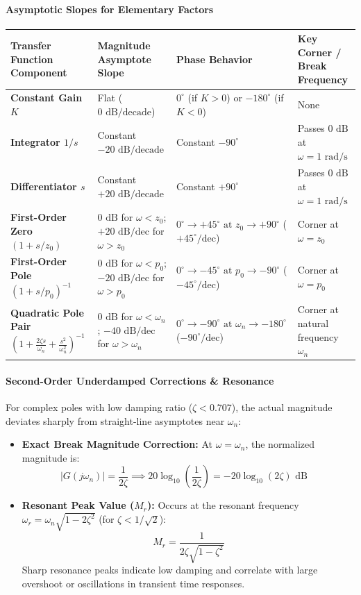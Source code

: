 \documentclass[12pt,onecolumn,twoside ]{article}
\begin{document}
	\paragraph{Asymptotic Slopes for Elementary Factors}
	\begin{center}\small\begin{tabularx}{\textwidth}{*{4}{Y}}
			\toprule
			\textbf{Transfer Function Component} & \textbf{Magnitude Asymptote Slope} & \textbf{Phase Behavior} & \textbf{Key Corner / Break Frequency} \\
			\midrule
			\textbf{Constant Gain $K$} & Flat ($0\text{ dB/decade}$) & $0^\circ$ (if $K>0$) or $-180^\circ$ (if $K<0$) & None \\
			\textbf{Integrator $1/s$} & Constant $-20\text{ dB/decade}$ & Constant $-90^\circ$ & Passes $0\text{ dB}$ at $\omega = 1\text{ rad/s}$ \\
			\textbf{Differentiator $s$} & Constant $+20\text{ dB/decade}$ & Constant $+90^\circ$ & Passes $0\text{ dB}$ at $\omega = 1\text{ rad/s}$ \\
			\textbf{First-Order Zero $(1 + s/z_0)$} & $0\text{ dB}$ for $\omega < z_0$; $+20\text{ dB/dec}$ for $\omega > z_0$ & $0^\circ \to +45^\circ \text{ at } z_0 \to +90^\circ$ ($+45^\circ/\text{dec}$) & Corner at $\omega = z_0$ \\
			\textbf{First-Order Pole $(1 + s/p_0)^{-1}$} & $0\text{ dB}$ for $\omega < p_0$; $-20\text{ dB/dec}$ for $\omega > p_0$ & $0^\circ \to -45^\circ \text{ at } p_0 \to -90^\circ$ ($-45^\circ/\text{dec}$) & Corner at $\omega = p_0$ \\
			\textbf{Quadratic Pole Pair} $\left(1 + \frac{2\zeta s}{\omega_n} + \frac{s^2}{\omega_n^2}\right)^{-1}$ & $0\text{ dB}$ for $\omega < \omega_n$; $-40\text{ dB/dec}$ for $\omega > \omega_n$ & $0^\circ \to -90^\circ \text{ at } \omega_n \to -180^\circ$ ($-90^\circ/\text{dec}$) & Corner at natural frequency $\omega_n$ \\
			\bottomrule
	\end{tabularx}\end{center}
	\paragraph{Second-Order Underdamped Corrections \& Resonance}
	For complex poles with low damping ratio ($\zeta < 0.707$), the actual magnitude deviates sharply from straight-line asymptotes near $\omega_n$:
	\begin{itemize}
		\item
		\textbf{Exact Break Magnitude Correction:} At $\omega = \omega_n$, the normalized magnitude is: \[
		|G(j\omega_n)| = \frac{1}{2\zeta} \implies 20\log_{10}\left(\frac{1}{2\zeta}\right) = -20\log_{10}(2\zeta)\text{ dB} \quad
		\]
		\item
		\textbf{Resonant Peak Value ($M_r$):} Occurs at the resonant frequency $\omega_r = \omega_n \sqrt{1 - 2\zeta^2}$ (for $\zeta < 1/\sqrt{2}$): \[
		M_r = \frac{1}{2\zeta \sqrt{1 - \zeta^2}}
		\] Sharp resonance peaks indicate low damping and correlate with large overshoot or oscillations in transient time responses.
	\end{itemize}
	
\end{document}
